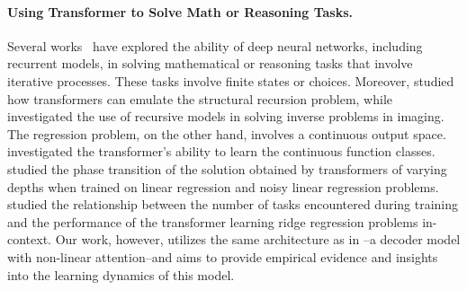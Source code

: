 \documentclass{article} %
\theoremstyle{plain}
\theoremstyle{definition}
\theoremstyle{remark}
\begin{document}
\paragraph{Using Transformer to Solve Math or Reasoning Tasks.}
Several works~\citep{Ongie2020DeepLT, Doncevic2022ARR, Zhang2022UnveilingTW, Zhou2022TeachingAR, Wei2022ChainOT, Zhou2022LeasttoMostPE, Bansal2022EndtoendAS, Charton2022WhatIM, Goel2022RecurrentCN, Zhang2023CanTL, Dziri2023FaithAF, lee2023teaching, Liu2022TransformersLS} have explored the ability of deep neural networks, including recurrent models, in solving mathematical or reasoning tasks that involve iterative processes. These tasks involve finite states or choices. Moreover, \citet{Zhang2023CanTL} studied how transformers can emulate the structural recursion problem, while \citet{Ongie2020DeepLT} investigated the use of recursive models in solving inverse problems in imaging. The regression problem, on the other hand, involves a continuous output space. \citet{Garg2022WhatCT} investigated the transformer's ability to learn the continuous function classes. \citet{Akyrek2022WhatLA} studied the phase transition of the solution obtained by transformers of varying depths when trained on linear regression and noisy linear regression problems. 
\citet{raventos2023effects} studied the relationship between the number of tasks encountered during training and the performance of the transformer learning ridge regression problems in-context.
Our work, however, utilizes the same architecture as in \citet{Garg2022WhatCT}--a decoder model with non-linear attention--and aims to provide empirical evidence and insights into the learning dynamics of this model.
\end{document}
